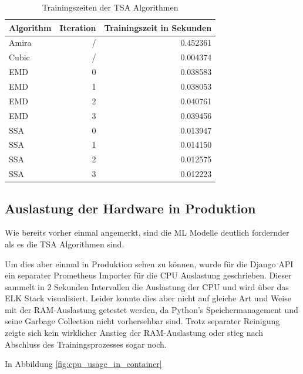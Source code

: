 \begin{table}[ht]
    \centering
    \caption{Trainingszeiten der \ac{TSA} Algorithmen}
    \begin{tabular}{lrr}
        \toprule
        Algorithm & Iteration & Trainingszeit in Sekunden \\
        \midrule
        Amira     & /         & 0.452361                  \\
        Cubic     & /         & 0.004374                  \\
        EMD       & 0         & 0.038583                  \\
        EMD       & 1         & 0.038053                  \\
        EMD       & 2         & 0.040761                  \\
        EMD       & 3         & 0.039456                  \\
        SSA       & 0         & 0.013947                  \\
        SSA       & 1         & 0.014150                  \\
        SSA       & 2         & 0.012575                  \\
        SSA       & 3         & 0.012223                  \\
        \bottomrule
    \end{tabular}
    \label{tab:trainingszeiten_tsa}
\end{table}


\subsection{Auslastung der Hardware in Produktion}
Wie bereits vorher einmal angemerkt, sind die \ac{ML} Modelle deutlich fordernder als es die \ac{TSA} Algorithmen sind.

Um dies aber einmal in Produktion sehen zu können, wurde für die Django \ac{API} ein separater Prometheus Importer für die CPU Auslastung geschrieben.
Dieser sammelt in 2 Sekunden Intervallen die Auslastung der CPU und wird über das \ac{ELK} Stack visualisiert.
Leider konnte dies aber nicht auf gleiche Art und Weise mit der RAM-Auslastung getestet werden, da Python's Speichermanagement und seine Garbage Collection nicht vorhersehbar sind. Trotz separater Reinigung zeigte sich kein wirklicher Anstieg der RAM-Auslastung oder stieg nach Abschluss des Trainingsprozesses sogar noch.

In Abbildung \ref{fig:cpu_usage_in_container}

